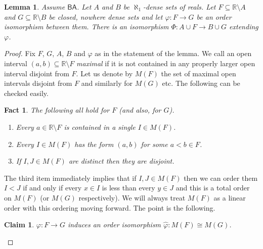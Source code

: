 \documentclass[leqno,11pt]{amsart}
\newtheorem{lemma}[theorem]{Lemma}
\newtheorem{fact}[theorem]{Fact}
\newtheorem{claim}[theorem]{Claim}
\theoremstyle{definition}
\theoremstyle{remark}
\def\BA{\mathsf{BA}}
\begin{document}
\begin{lemma} \label{key}
    Assume $\BA$. Let $A$ and $B$ be $\aleph_1$-dense sets of reals. Let $F \subseteq \mathbb R \setminus A$ and $G \subseteq \mathbb R \setminus B$ be closed, nowhere dense sets and let $\varphi:F \to G$ be an order isomorphism between them. There is an isomorphism $\Phi:A \cup F \to B \cup G$ extending $\varphi$.
\end{lemma}

\begin{proof}
    Fix $F$, $G$, $A$, $B$ and $\varphi$ as in the statement of the lemma. We call an open interval $(a, b) \subseteq \mathbb R \setminus F$ {\em maximal} if it is not contained in any properly larger open interval disjoint from $F$. Let us denote by $M(F)$ the set of maximal open intervals disjoint from $F$ and similarly for $M(G)$ etc. The following can be checked easily.

    \begin{fact}
        The following all hold for $F$ (and also, for $G$).
        \begin{enumerate}
            \item Every $a \in \mathbb R \setminus F$ is contained in a single $I \in M(F)$.
            \item Every $I \in M(F)$ has the form $(a, b)$ for some $a < b \in F$.
            \item If $I, J \in M(F)$ are distinct then they are disjoint.
        \end{enumerate}
    \end{fact}

    The third item immediately implies that if $I , J \in M(F)$ then we can order them $I < J$ if and only if every $x \in I$ is less than every $y \in J$ and this is a total order on $M(F)$ (or $M(G)$ respectively). We will always treat $M(F)$ as a linear order with this ordering moving forward. The point is the following.

    \begin{claim}
        $\varphi:F \to G$ induces an order isomorphism $\hat{\varphi}:M(F) \cong M(G)$.
    \end{claim}


\end{proof}
\end{document}

